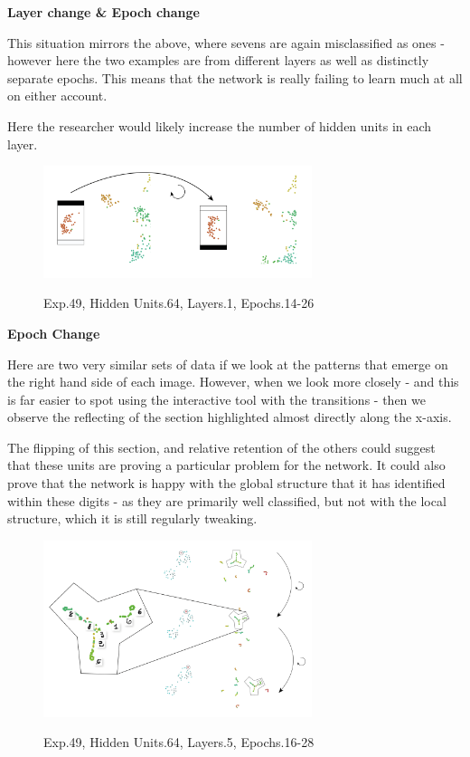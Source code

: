 \documentclass[a4paper,11pt,titlepage]{article}
\begin{document}
	\textbf{Layer change \& Epoch change}
	\par 
	This situation mirrors the above, where sevens are again misclassified as ones - however here the two examples are from different layers as well as distinctly separate epochs. This means that the network is really failing to learn much at all on either account. 
	\par 
	Here the researcher would likely increase the number of hidden units in each layer.


	\begin{figure}[H]
    			\centering	
			{{\includegraphics[width=0.7\textwidth]
    				{img/conc_X49_H64_L1_E14-26.png} 
    			}}%
    			\caption{Exp.49, Hidden Units.64, Layers.1, Epochs.14-26}%
    		\label{fig:mnistHinton}
	\end{figure}
	
	\textbf{Epoch Change}
	\par 
	Here are two very similar sets of data if we look at the patterns that emerge on the right hand side of each image. However, when we look more closely - and this is far easier to spot using the interactive tool with the transitions - then we observe the reflecting of the section highlighted almost directly along the x-axis. 
	\par 
	The flipping of this section, and relative retention of the others could suggest that these units are proving a particular problem for the network. It could also prove that the network is happy with the global structure that it has identified within these digits - as they are primarily well classified, but not with the local structure, which it is still regularly tweaking.

	\begin{figure}[H]
    			\centering	
			{{\includegraphics[width=0.7\textwidth]
    				{img/conc_X49_H64_L5_E16-28.png} 
    			}}%
    			\caption{Exp.49, Hidden Units.64, Layers.5, Epochs.16-28}%
    		\label{fig:mnistHinton}
	\end{figure}
\end{document}
